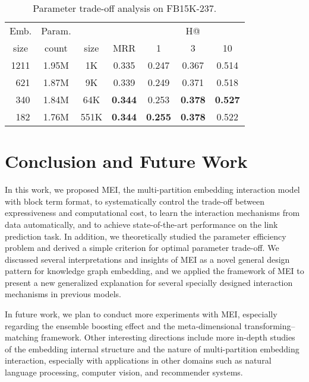 \documentclass{ecai}
\theoremstyle{plain}  \newtheorem{thm}{Theorem}  \newtheorem{lem}[thm]{Lemma}  \newtheorem{prop}[thm]{Proposition}
\theoremstyle{remark}  \newtheorem*{rem}{Remark}
\begin{document}
\begin{table}\caption{Parameter trade-off analysis on FB15K-237.}
	\label{tab:trade-off}
	\centering	
	\begin{adjustbox}{max width=\columnwidth}
		\begin{tabular}{@{\extracolsep{0pt}}ccccccc}
			\toprule
			Emb. & Param. &  & & \multicolumn{3}{c}{{H@}}   \\
			size & count & size & MRR & 1 & 3 & 10 \\
			\hline
			1211 & 1.95M & 1K & 0.335 & 0.247 & 0.367 & 0.514  \\
			\,\,\,621 & 1.87M & 9K & 0.339 & 0.249 & 0.371 & 0.518  \\
			\,\,\,340 & 1.84M & 64K & \textbf{0.344} & 0.253 & \textbf{0.378} & \textbf{0.527}  \\
			\,\,\,182 & 1.76M & 551K & \textbf{0.344} & \textbf{0.255} & \textbf{0.378} & 0.522  \\
			\bottomrule
		\end{tabular}
	\end{adjustbox}
\end{table}

\section{Conclusion and Future Work} \label{sect:conclusion} In this work, we proposed MEI, the multi-partition embedding interaction model with block term format, to systematically control the trade-off between expressiveness and computational cost, to learn the interaction mechanisms from data automatically, and to achieve state-of-the-art performance on the link prediction task. In addition, we theoretically studied the parameter efficiency problem and derived a simple criterion for optimal parameter trade-off. We discussed several interpretations and insights of MEI as a novel general design pattern for knowledge graph embedding, and we applied the framework of MEI to present a new generalized explanation for several specially designed interaction mechanisms in previous models.

In future work, we plan to conduct more experiments with MEI, especially regarding the ensemble boosting effect and the meta-dimensional transforming--matching framework. Other interesting directions include more in-depth studies of the embedding internal structure and the nature of multi-partition embedding interaction, especially with applications in other domains such as natural language processing, computer vision, and recommender systems.
\end{document}
